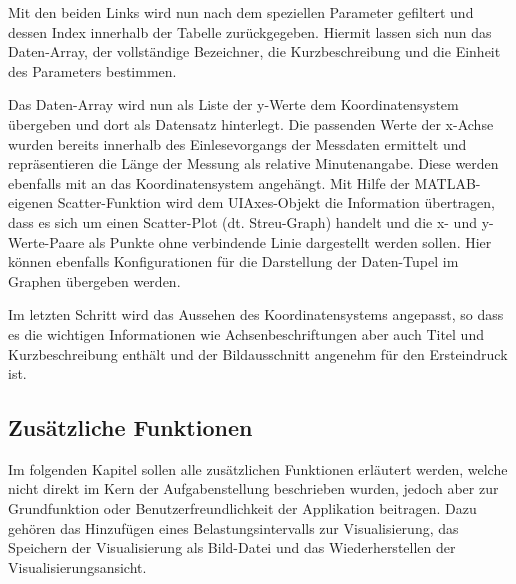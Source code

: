 \begin{minipage}{\linewidth}

\end{minipage}

Mit den beiden Links wird nun nach dem speziellen Parameter gefiltert und dessen Index innerhalb der Tabelle zurückgegeben. Hiermit lassen sich nun das Daten-Array, der vollständige Bezeichner, die Kurzbeschreibung und die Einheit des Parameters bestimmen. 

\begin{minipage}{\linewidth}

\end{minipage}

Das Daten-Array wird nun als Liste der y-Werte dem Koordinatensystem übergeben und dort als Datensatz hinterlegt. Die passenden Werte der x-Achse wurden bereits innerhalb des Einlesevorgangs der Messdaten ermittelt und repräsentieren die Länge der Messung als relative Minutenangabe. Diese werden ebenfalls mit an das Koordinatensystem angehängt. Mit Hilfe der MATLAB-eigenen Scatter-Funktion wird dem UIAxes-Objekt die Information übertragen, dass es sich um einen Scatter-Plot (dt. Streu-Graph) handelt und die x- und y-Werte-Paare als Punkte ohne verbindende Linie dargestellt werden sollen. Hier können ebenfalls Konfigurationen für die Darstellung der Daten-Tupel im Graphen übergeben werden.

\begin{minipage}{\linewidth}

\end{minipage}

Im letzten Schritt wird das Aussehen des Koordinatensystems angepasst, so dass es die wichtigen Informationen wie Achsenbeschriftungen aber auch Titel und Kurzbeschreibung enthält und der Bildausschnitt angenehm für den Ersteindruck ist.

\subsection{Zusätzliche Funktionen}

Im folgenden Kapitel sollen alle zusätzlichen Funktionen erläutert werden, welche nicht direkt im Kern der Aufgabenstellung beschrieben wurden, jedoch aber zur Grundfunktion oder Benutzerfreundlichkeit der Applikation beitragen. Dazu gehören das Hinzufügen eines Belastungsintervalls zur Visualisierung, das Speichern der Visualisierung als Bild-Datei und das Wiederherstellen der Visualisierungsansicht.

